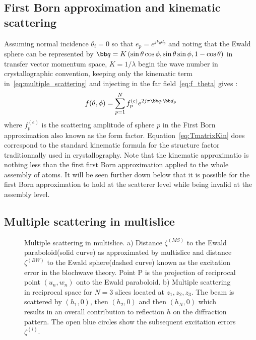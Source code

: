 \subsection{First Born approximation and kinematic scattering}
Assuming normal incidence $\theta_i=0$ so that $e_p=e^{jk_0d_p}$
and noting that the Ewald sphere can be represented by
$\bb q = K\left(\sin\theta\cos\phi,\sin\theta\sin\phi,1-\cos\theta\right)$
in transfer vector momentum space,
$K=1/\lambda$ begin the wave number in crystallographic convention,
keeping only the kinematic term in~\eqref{eq:multiple_scattering}
and injecting in the far field~\eqref{eq:f_theta} gives :
%
\begin{equation}\label{eq:TmatrixKin}
  f(\theta,\phi) = \sum_{p=1}^{N}f_p^{(e)}e^{2j\pi \bb q\cdot \bb d_p}
\end{equation}
%
where $f_p^{(e)}$ is the scattering amplitude of sphere $p$ in the
First Born approximation also known as the form factor.
Equation~\eqref{eq:TmatrixKin} does correspond to the standard kinematic
formula for the structure factor traditionnally used in crystallography.
Note that the kinematic approximatio is nothing less than the first first Born
approximation applied to the whole assembly of atoms. It will be seen further
down below that it is possible for the first Born approximation to hold at the
scatterer level while being invalid at the assembly level.





\subsection{Multiple scattering in multislice}

\begin{figure}[h!]
\caption{Multiple scattering in multislice.
a) Distance $\zeta^{(MS)}$ to the Ewald paraboloid(solid curve) as approximated by
multislice and distance $\zeta^{(BW)}$ to the Ewald sphere(dashed curve) known as the
excitation error in the blochwave theory. Point P is the projection of
reciprocal point $(u_n,w_n)$ onto the Ewald paraboloid.
b) Multiple scattering in reciprocal space for $N=3$ slices located at $z_1, z_2, z_3$.
The beam is scattered by $(h_1,0)$, then $(h_2,0)$ and then $(h_N,0)$ which
results in an overall contribution to reflection $h$ on the diffraction pattern.
The open blue circles show the subsequent excitation errors $\zeta^{(i)}$.
}%
\end{figure}

